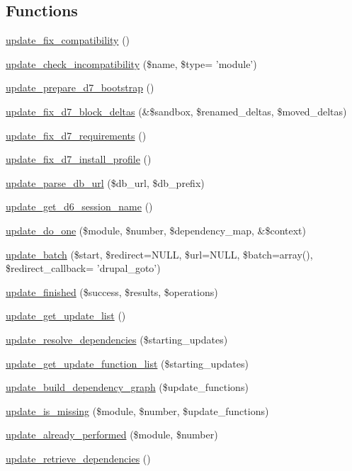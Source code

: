 \subsection*{Functions}
\begin{DoxyCompactItemize}
\item 
\hyperlink{update_8inc_ab86cb0f00b89fc52f7f6294be9a1e33c}{update\_\-fix\_\-compatibility} ()
\item 
\hyperlink{update_8inc_a39592132a77fd791c44a8d6faf362cb0}{update\_\-check\_\-incompatibility} (\$name, \$type= 'module')
\item 
\hyperlink{update_8inc_ae3ce2c866dce2d33c363b57136a2ba84}{update\_\-prepare\_\-d7\_\-bootstrap} ()
\item 
\hyperlink{update_8inc_a349ad25ac5547fbb44556538758988a2}{update\_\-fix\_\-d7\_\-block\_\-deltas} (\&\$sandbox, \$renamed\_\-deltas, \$moved\_\-deltas)
\item 
\hyperlink{update_8inc_a00697f7fb179855f3c3fa65105abee94}{update\_\-fix\_\-d7\_\-requirements} ()
\item 
\hyperlink{update_8inc_a4c65cc44fc9d615c6f69ac8ecb57bf5a}{update\_\-fix\_\-d7\_\-install\_\-profile} ()
\item 
\hyperlink{update_8inc_a39f4938dea0ce704d1e426243cec11ec}{update\_\-parse\_\-db\_\-url} (\$db\_\-url, \$db\_\-prefix)
\item 
\hyperlink{update_8inc_a1e41248922d100f2412b8471c05c59be}{update\_\-get\_\-d6\_\-session\_\-name} ()
\item 
\hyperlink{update_8inc_ac46854f64e50a81361ed8816b8f0ce7e}{update\_\-do\_\-one} (\$module, \$number, \$dependency\_\-map, \&\$context)
\item 
\hyperlink{update_8inc_aa4dd3d84e553f6bf25ad19608152d5b7}{update\_\-batch} (\$start, \$redirect=NULL, \$url=NULL, \$batch=array(), \$redirect\_\-callback= 'drupal\_\-goto')
\item 
\hyperlink{update_8inc_a80f7fdd8ca66ebda4959b9429fc343f3}{update\_\-finished} (\$success, \$results, \$operations)
\item 
\hyperlink{update_8inc_ae95fb5ec58e85fd5c10c56345fd7cabe}{update\_\-get\_\-update\_\-list} ()
\item 
\hyperlink{update_8inc_aa931d6cdddc2e9e0ec96d240523056e9}{update\_\-resolve\_\-dependencies} (\$starting\_\-updates)
\item 
\hyperlink{update_8inc_ad268e1662e1d06a85f3d51dfec9955b2}{update\_\-get\_\-update\_\-function\_\-list} (\$starting\_\-updates)
\item 
\hyperlink{update_8inc_aafca47c65645d8463d85a3fa7884c220}{update\_\-build\_\-dependency\_\-graph} (\$update\_\-functions)
\item 
\hyperlink{update_8inc_ab41c0d635b6a220d269146f778a6a245}{update\_\-is\_\-missing} (\$module, \$number, \$update\_\-functions)
\item 
\hyperlink{update_8inc_a6ccab16044efda416011fc20367d9344}{update\_\-already\_\-performed} (\$module, \$number)
\item 
\hyperlink{update_8inc_af82e7fa9b13df713eb110a4e782b0e69}{update\_\-retrieve\_\-dependencies} ()
\end{DoxyCompactItemize}


